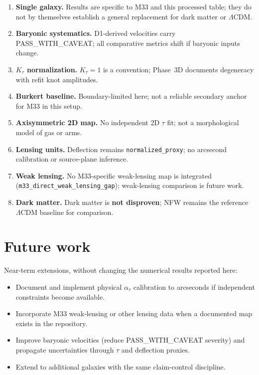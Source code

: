 \documentclass[11pt,a4paper]{article}
\begin{document}
\begin{enumerate}
  \item \textbf{Single galaxy.} Results are specific to M33 and this processed table; they do not by themselves establish a general replacement for dark matter or $\Lambda$CDM.
  \item \textbf{Baryonic systematics.} D1-derived velocities carry PASS\_WITH\_CAVEAT; all comparative metrics shift if baryonic inputs change.
  \item \textbf{$K_\tau$ normalization.} $K_\tau=1$ is a convention; Phase~3D documents degeneracy with refit knot amplitudes.
  \item \textbf{Burkert baseline.} Boundary-limited here; not a reliable secondary anchor for M33 in this setup.
  \item \textbf{Axisymmetric 2D map.} No independent 2D $\tau$ fit; not a morphological model of gas or arms.
  \item \textbf{Lensing units.} Deflection remains \texttt{normalized\_proxy}; no arcsecond calibration or source-plane inference.
  \item \textbf{Weak lensing.} No M33-specific weak-lensing map is integrated (\texttt{m33\_direct\_weak\_lensing\_gap}); weak-lensing comparison is future work.
  \item \textbf{Dark matter.} Dark matter is \textbf{not disproven}; NFW remains the reference $\Lambda$CDM baseline for comparison.
\end{enumerate}

\section{Future work}
\label{sec:future}

Near-term extensions, without changing the numerical results reported here:
\begin{itemize}
  \item Document and implement physical $\alpha_\tau$ calibration to arcseconds if independent constraints become available.
  \item Incorporate M33 weak-lensing or other lensing data when a documented map exists in the repository.
  \item Improve baryonic velocities (reduce PASS\_WITH\_CAVEAT severity) and propagate uncertainties through $\tau$ and deflection proxies.
  \item Extend to additional galaxies with the same claim-control discipline.
\end{itemize}
\end{document}
